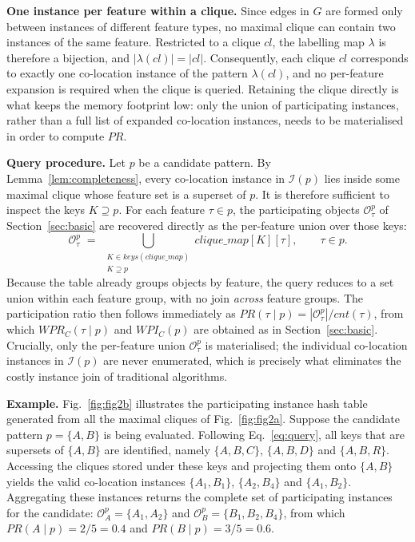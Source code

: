 \documentclass[12pt, letterpaper]{template}
\theoremstyle{definition}
\begin{document}
\noindent\textbf{One instance per feature within a clique.}
Since edges in $G$ are formed only between instances of different feature
types, no maximal clique can contain two instances of the same feature.
Restricted to a clique $cl$, the labelling map $\lambda$ is therefore a
bijection, and $|\lambda(cl)| = |cl|$. Consequently, each clique $cl$
corresponds to exactly one co-location instance of the pattern $\lambda(cl)$, and no per-feature expansion is required when
the clique is queried. Retaining the clique directly is what keeps the
memory footprint low: only the union of participating instances, rather
than a full list of expanded co-location instances, needs to be
materialised in order to compute $PR$.

\noindent\textbf{Query procedure.}
Let $p$ be a candidate pattern. By Lemma~\ref{lem:completeness}, every co-location instance in $\mathcal{I}(p)$ lies
inside some maximal clique whose feature set is a superset of $p$. It is
therefore sufficient to inspect the keys $K \supseteq p$. For each feature
$\tau \in p$, the participating objects $\mathcal{O}_\tau^p$ of
Section~\ref{sec:basic} are recovered directly as the per-feature union
over those keys:
\begin{equation}
\label{eq:query}
\mathcal{O}_\tau^p \;=\;
\bigcup_{\substack{K \in keys(clique\_map) \\ K \supseteq p}}
clique\_map[K][\tau],
\qquad \tau \in p .
\end{equation}
Because the table already groups objects by feature, the query reduces to
a set union within each feature group, with no join \emph{across} feature
groups. The participation ratio then follows immediately as
$PR(\tau \mid p) = |\mathcal{O}_\tau^p| / cnt(\tau)$, from which
$WPR_C(\tau \mid p)$ and $WPI_C(p)$ are obtained as in
Section~\ref{sec:basic}. Crucially, only the per-feature union
$\mathcal{O}_\tau^p$ is materialised; the individual co-location instances
in $\mathcal{I}(p)$ are never enumerated, which is precisely what
eliminates the costly instance join of traditional algorithms.

\noindent\textbf{Example.}
Fig.~\ref{fig:fig2b} illustrates the participating instance hash table generated from all
the maximal cliques of Fig.~\ref{fig:fig2a}. Suppose the candidate pattern
$p = \{A,B\}$ is being evaluated. Following Eq.~\ref{eq:query}, all keys that are supersets of
$\{A,B\}$ are identified, namely $\{A,B,C\}$, $\{A,B,D\}$ and $\{A,B,R\}$. Accessing the
cliques stored under these keys and projecting them onto $\{A,B\}$ yields the valid
co-location instances $\{A_1,B_1\}$, $\{A_2,B_4\}$ and $\{A_1,B_2\}$. Aggregating these
instances returns the complete set of participating instances for the candidate:
$\mathcal{O}_A^{p} = \{A_1, A_2\}$ and $\mathcal{O}_B^{p} = \{B_1, B_2, B_4\}$, from which
$PR(A \mid p) = 2/5 = 0.4$ and $PR(B \mid p) = 3/5 = 0.6$.
\end{document}
